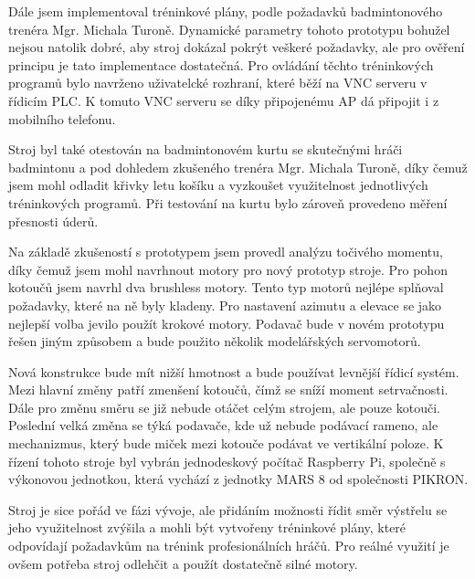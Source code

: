 Dále jsem implementoval tréninkové plány, podle požadavků badmintonového trenéra Mgr. Michala Turoně. Dynamické parametry tohoto prototypu bohužel nejsou natolik dobré, aby stroj dokázal pokrýt veškeré požadavky, ale pro ověření principu je tato implementace dostatečná. Pro ovládání těchto tréninkových programů bylo navrženo uživatelcké rozhraní, které běží na VNC serveru v řídicím PLC. K tomuto VNC serveru se díky připojenému AP dá připojit i z mobilního telefonu. 

Stroj byl také otestován na badmintonovém kurtu se skutečnými hráči badmintonu a pod dohledem zkušeného trenéra Mgr. Michala Turoně, díky čemuž jsem mohl odladit křivky letu košíku a vyzkoušet využitelnost jednotlivých tréninkových programů. Při testování na kurtu bylo zároveň provedeno měření přesnosti úderů.

Na základě zkušeností s prototypem jsem provedl analýzu točivého momentu, díky čemuž jsem mohl navrhnout motory pro nový prototyp stroje. Pro pohon kotoučů jsem navrhl dva brushless motory. Tento typ motorů nejlépe splňoval požadavky, které na ně byly kladeny. Pro nastavení azimutu a elevace se jako nejlepší volba jevilo použít krokové motory. Podavač bude v novém prototypu řešen jiným způsobem a bude použito několik modelářských servomotorů.

Nová konstrukce bude mít nižší hmotnost a bude používat levnější řídicí systém. Mezi hlavní změny patří zmenšení kotoučů, čímž se sníží moment setrvačnosti. Dále pro změnu směru se již nebude otáčet celým strojem, ale pouze kotouči. Poslední velká změna se týká podavače, kde už nebude podávací rameno, ale mechanizmus, který bude miček mezi kotouče podávat ve vertikální poloze. K řízení tohoto stroje byl vybrán jednodeskový počítač Raspberry Pi, společně s výkonovou jednotkou, která vychází z jednotky MARS 8 od společnosti PIKRON.

Stroj je sice pořád ve fázi vývoje, ale přidáním možnosti řídit směr výstřelu se jeho využitelnost zvýšila a mohli být vytvořeny tréninkové plány, které odpovídají požadavkům na trénink profesionálních hráčů. Pro reálné využití je ovšem potřeba stroj odlehčit a použít dostatečně silné motory. 




